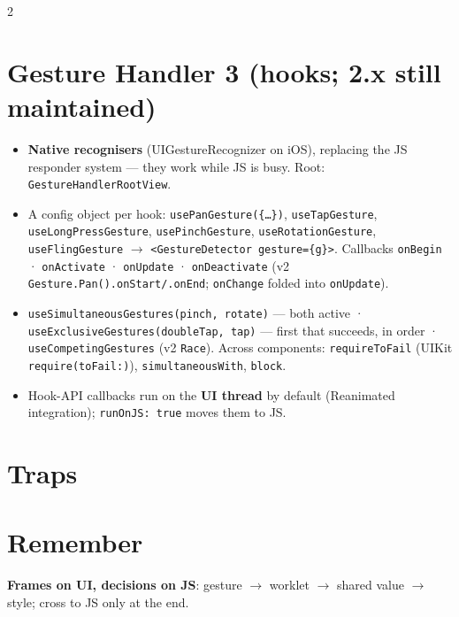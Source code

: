 \documentclass[8pt]{extarticle}
\begin{document}
\begin{multicols}{2}
\section{Gesture Handler 3 (hooks; 2.x still maintained)}
\begin{itemize}
  \item \textbf{Native recognisers} (UIGestureRecognizer on iOS), replacing the JS responder
        system — they work while JS is busy. Root: \texttt{GestureHandlerRootView}.
  \item A config object per hook: \texttt{usePanGesture(\{…\})}, \texttt{useTapGesture},
        \texttt{useLongPressGesture}, \texttt{usePinchGesture}, \texttt{useRotationGesture},
        \texttt{useFlingGesture} $\to$ \texttt{<GestureDetector gesture=\{g\}>}. Callbacks
        \texttt{onBegin} · \texttt{onActivate} · \texttt{onUpdate} · \texttt{onDeactivate}
        (v2 \texttt{Gesture.Pan().onStart/.onEnd}; \texttt{onChange} folded into \texttt{onUpdate}).
  \item \texttt{useSimultaneousGestures(pinch, rotate)} — both active ·
        \texttt{useExclusiveGestures(doubleTap, tap)} — first that succeeds, in order ·
        \texttt{useCompetingGestures} (v2 \texttt{Race}). Across components:
        \texttt{requireToFail} (UIKit \texttt{require(toFail:)}), \texttt{simultaneousWith},
        \texttt{block}.
  \item Hook-API callbacks run on the \textbf{UI thread} by default (Reanimated
        integration); \texttt{runOnJS: true} moves them to JS.
\end{itemize}

\section{Traps}
\begin{itemize}
\end{itemize}

\section{Remember}
\textbf{Frames on UI, decisions on JS}: gesture $\to$ worklet $\to$ shared value $\to$
style; cross to JS only at the end.


\end{multicols}

\end{document}
